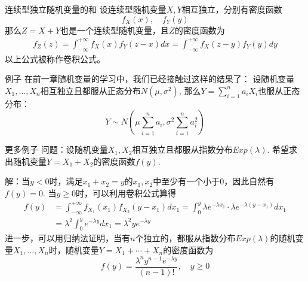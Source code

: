 
\begin{frame}

\begin{block}{连续型独立随机变量的和}
设连续型随机变量$X,Y$相互独立，分别有密度函数
$$f_X(x), \quad f_Y(y)$$
那么$Z = X+Y$也是一个连续型随机变量，且$Z$的密度函数为
\begin{align*}
f_Z(z) = \int_{-\infty}^{+\infty} f_X(x) f_Y(z-x)dx =
\int_{-\infty}^{+\infty} f_X(z-y) f_Y(y)dy
\end{align*}
以上公式被称作卷积公式。
\end{block}

\end{frame}


\begin{frame}

\begin{block}{例子}
在前一章随机变量的学习中，我们已经接触过这样的结果了：\newline
设随机变量$X_1,\ldots,X_n$相互独立且都服从正态分布$N(\mu, \sigma^2)$, 那么$Y = \sum\limits_{i=1}^n a_iX_i$也服从正态分布：
$$Y \sim N \left( \mu \sum\limits_{i=1}^n a_i, \sigma^2 \sum\limits_{i=1}^n a_i^2 \right)$$
\end{block}

\end{frame}


\begin{frame}

\begin{block}{更多例子}
问题：设随机变量$X_1,X_2$相互独立且都服从指数分布$Exp(\lambda)$. 希望求出随机变量$Y = X_1+X_2$的密度函数$f(y)$.

\vspace{1em}
\pause

解：当$y<0$时，满足$x_1+x_2=y$的$x_1,x_2$中至少有一个小于0，因此自然有$f(y) = 0$. 当$y\ge 0$时，可以利用卷积公式算得
\begin{align*}
f(y) & = \int_{-\infty}^{+\infty} f_{X_1}(x_1) f_{X_2}(y-x_1) dx_1 = \int_{0}^{y} \lambda e^{-\lambda x_1} \cdot \lambda e^{-\lambda (y-x_1)} dx_1 \\
& = \lambda^2 \int_{0}^{y} e^{-\lambda y} dx_1 = \lambda^2 y e^{-\lambda y}
\end{align*}
进一步，可以用归纳法证明，当有$n$个独立的，都服从指数分布$Exp(\lambda)$的随机变量$X_1,\ldots,X_n$时，随机变量$Y = X_1+\cdots+X_n$的密度函数为
$$f(y) = \dfrac{\lambda^n y^{n-1} e^{-\lambda y}}{(n-1)!}, \quad y \ge 0$$
\end{block}

\end{frame}

